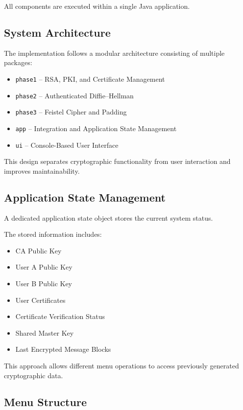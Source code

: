 \documentclass[12pt]{article}
\begin{document}
All components are executed within a single Java application.

\subsection{System Architecture}

The implementation follows a modular architecture consisting of multiple packages:

\begin{itemize}
\item \texttt{phase1} -- RSA, PKI, and Certificate Management
\item \texttt{phase2} -- Authenticated Diffie--Hellman
\item \texttt{phase3} -- Feistel Cipher and Padding
\item \texttt{app} -- Integration and Application State Management
\item \texttt{ui} -- Console-Based User Interface
\end{itemize}

This design separates cryptographic functionality from user interaction and improves maintainability.

\subsection{Application State Management}

A dedicated application state object stores the current system status.

The stored information includes:

\begin{itemize}
\item CA Public Key
\item User A Public Key
\item User B Public Key
\item User Certificates
\item Certificate Verification Status
\item Shared Master Key
\item Last Encrypted Message Blocks
\end{itemize}

This approach allows different menu operations to access previously generated cryptographic data.

\subsection{Menu Structure}
\end{document}
